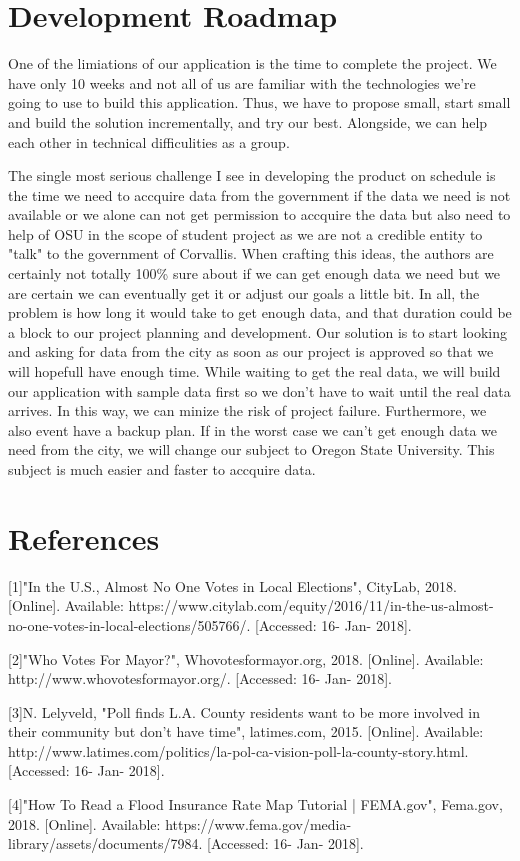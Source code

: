 \documentclass[12pt]{article}
\begin{document}
\section{Development Roadmap}

One of the limiations of our application is the time to complete the project. We have only 10 weeks and not all of us are familiar with the technologies we're going to use to build this application. Thus, we have to propose small, start small and build the solution incrementally, and try our best. Alongside, we can help each other in technical difficulities as a group.

The single most serious challenge I see in developing the product on schedule is the time we need to accquire data from the government if the data we need is not available or we alone can not get permission to accquire the data but also need to help of OSU in the scope of student project as we are not a credible entity to "talk" to the government of Corvallis. When crafting this ideas, the authors are certainly not totally 100\% sure about if we can get enough data we need but we are certain we can eventually get it or adjust our goals a little bit. In all, the problem is how long it would take to get enough data, and that duration could be a block to our project planning and development. Our solution is to start looking and asking for data from the city as soon as our project is approved so that we will hopefull have enough time. While waiting to get the real data, we will build our application with sample data first so we don't have to wait until the real data arrives. In this way, we can minize the risk of project failure. Furthermore, we also event have a backup plan. If in the worst case we can't get enough data we need from the city, we will change our subject to Oregon State University. This subject is much easier and faster to accquire data.


\section{References}

[1]"In the U.S., Almost No One Votes in Local Elections", CityLab, 2018. [Online]. Available: https://www.citylab.com/equity/2016/11/in-the-us-almost-no-one-votes-in-local-elections/505766/. [Accessed: 16- Jan- 2018].

[2]"Who Votes For Mayor?", Whovotesformayor.org, 2018. [Online]. Available: http://www.whovotesformayor.org/. [Accessed: 16- Jan- 2018].


[3]N. Lelyveld, "Poll finds L.A. County residents want to be more involved in their community but don't have time", latimes.com, 2015. [Online]. Available: http://www.latimes.com/politics/la-pol-ca-vision-poll-la-county-story.html. [Accessed: 16- Jan- 2018].

[4]"How To Read a Flood Insurance Rate Map Tutorial | FEMA.gov", Fema.gov, 2018. [Online]. Available: https://www.fema.gov/media-library/assets/documents/7984. [Accessed: 16- Jan- 2018].



\end{document}
